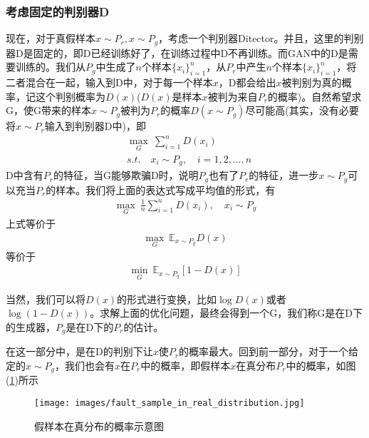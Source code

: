             \subsubsection{考虑固定的判别器D}
            \par
            现在，对于真假样本$x\sim P_r,x\sim P_g$，考虑一个判别器Ditector。并且，这里的判别器D是固定的，即D已经训练好了，在训练过程中D不再训练。而GAN中的D是需要训练的。我们从$P_g$中生成了$n$个样本$\{x_i\}_{i=1}^n$，从$P_r$中产生$n$个样本$\{x_i\}_{i=1}^n$，将二者混合在一起，输入到D中，对于每一个样本$x$，D都会给出$x$被判别为真的概率，记这个判别概率为$D(x)$($D(x)$是样本$x$被判为来自$P_r$的概率)。自然希望求G，使G带来的样本$x\sim P_g$被判为$P_r$的概率$D(x\sim P_g)$尽可能高(其实，没有必要将$x\sim P_r$输入到判别器D中)，即
            \begin{align*}
            & \max _G\ \sum_{i=1}^n D(x_i)\\
            & s.t. \quad x_i\sim P_g,\quad i=1,2,\dots,n
            \end{align*}
            D中含有$P_r$的特征，当G能够欺骗D时，说明$P_g$也有了$P_r$的特征，进一步$x\sim P_g$可以充当$P_r$的样本。我们将上面的表达式写成平均值的形式，有
            \begin{align*}
            \max _G \ \frac{1}{n}\sum_{i=1}^n D(x_i) ,\quad x_i \sim P_g
            \end{align*}
            上式等价于
            \begin{align*}
            \max_G\ \mathbb{E}_{x\sim P_g} D(x)
            \end{align*}
            等价于
            \begin{align*}
            \min _G \ \mathbb{E}_{x\sim P_g}[1-D(x)]
            \end{align*}
            \par
            当然，我们可以将$D(x)$的形式进行变换，比如$\log D(x)$或者$\log (1-D(x))$。求解上面的优化问题，最终会得到一个G，我们称G是在D下的生成器，$P_g$是在D下的$P_r$的估计。
            \par
            在这一部分中，是在D的判别下让$x$使$P_r$的概率最大。回到前一部分，对于一个给定的$x\sim P_g$，我们也会有$x$在$P_r$中的概率，即假样本$x$在真分布$P_r$中的概率，如图(\ref{fig:假样本在真分布的概率示意图})所示
                \begin{figure}[H]
                \centering
                \texttt{[image: images/fault\_sample\_in\_real\_distribution.jpg]}
                \caption{假样本在真分布的概率示意图}
                \label{fig:假样本在真分布的概率示意图}
                \end{figure}
